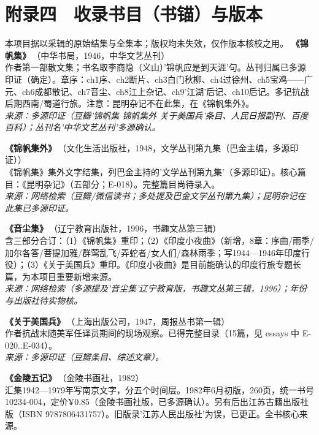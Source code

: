 \documentclass[UTF8,fontset=none,zihao=-4,a4paper]{ctexart}
\begin{document}
\section{附录四　收录书目（书锚）与版本}
\noindent\small 本项目据以采辑的原始结集与全集本；版权均未失效，仅作版本核校之用。\normalsize\medskip
\noindent\textbf{《锦帆集》}\,{\small（中华书局，1946，中华文艺丛刊）}\\
作者第一部散文集；书名取李商隐（义山）'锦帆应是到天涯'句。丛刊归属已多源印证（确定）。章序：ch1序、ch2断片、ch3白门秋柳、ch4过徐州、ch5宝鸡——广元、ch6成都散记、ch7音尘、ch8江上杂记、ch9'江湖'后记、ch10后记。多记抗战后期西南/蜀道行旅。注意：昆明杂记不在此集，在《锦帆集外》。
\\{\small\itshape 来源：多源印证（豆瓣'锦帆集 锦帆集外 关于美国兵'条目、人民日报副刊、百度百科）；丛刊名'中华文艺丛刊'多源确认。}
\par\vspace{5pt}
\noindent\textbf{《锦帆集外》}\,{\small（文化生活出版社，1948，文学丛刊第九集（巴金主编，多源印证））}\\
《锦帆集》集外文字结集，列巴金主持的'文学丛刊第九集'（多源印证）。核心篇目：《昆明杂记》（五部分；E-018）。完整篇目尚待录入。
\\{\small\itshape 来源：网络检索（豆瓣/微信读书；多处提及巴金文学丛刊第九集）；昆明杂记在此集已多源印证。}
\par\vspace{5pt}
\noindent\textbf{《音尘集》}\,{\small（辽宁教育出版社，1996，书趣文丛第三辑）}\\
含三部分合订：（1）《锦帆集》重印；（2）《印度小夜曲》（新增，8章：序曲/雨季/加尔各答/菩提加雅/群莺乱飞/弄蛇者/女人们/森林雨季；写1944—1946年印度行役）；（3）《关于美国兵》重印。《印度小夜曲》是目前能确认的印度行旅专题长篇，为本项目重要新增来源。
\\{\small\itshape 来源：网络检索（多源提及'音尘集'辽宁教育版，书趣文丛第三辑，1996）；年份与出版社待实物核。}
\par\vspace{5pt}
\noindent\textbf{《关于美国兵》}\,{\small（上海出版公司，1947，周报丛书第一辑）}\\
作者抗战末随美军任译员期间的现场观察。已得完整目录（15篇，见 essays 中 E-020..E-034）。
\\{\small\itshape 来源：多源印证（豆瓣条目、综述文章）。}
\par\vspace{5pt}
\noindent\textbf{《金陵五记》}\,{\small（金陵书画社，1982）}\\
汇集1942—1979年写南京文字，分五个时间层。1982年6月初版，260页，统一书号10234-004，定价¥0.85（金陵书画社版，已多源确认）。另有后出江苏古籍出版社版（ISBN 9787806431757）。旧版录'江苏人民出版社'为误，已更正。全书核心来源。
\end{document}
